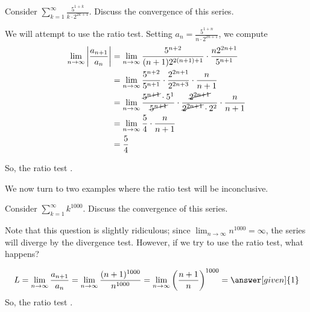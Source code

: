 \documentclass{ximera}
\begin{document}
\begin{example}
  Consider $  \sum_{k=1}^\infty \frac{5^{1+k}}{k \cdot 2^{2k+1}}$.  Discuss the convergence of this series.
  \begin{explanation}
    We will attempt to use the ratio test. Setting $a_n =
    \frac{5^{1+n}}{n \cdot  2^{2n+1}}$, we compute  
\begin{align*}
    \lim_{n \to \infty} \left|\frac{a_{n+1}}{a_n}\right| &= \lim_{n \to \infty} \frac{5^{n+2}}{(n+1)2^{2(n+1)+1}} \cdot  \frac{n 2^{2n+1}}{5^{n+1}}\\
	&=\lim_{n \to \infty} \frac{5^{n+2}}{5^{n+1}} \cdot  \frac{2^{2n+1}}{2^{2n+3}} \cdot \frac{n}{n+1}\\
	&=\lim_{n \to \infty} \frac{\cancel{5^{n+1}}\cdot 5^1}{\cancel{5^{n+1}}} \cdot  \frac{\cancel{2^{2n+1}}}{\cancel{2^{2n+1}}\cdot 2^2} \cdot \frac{n}{n+1}\\
	&=\lim_{n \to \infty} \frac{5}{4} \cdot \frac{n}{n+1}\\
	&=\frac{5}{4}
      \end{align*}	
      
    So, the ratio test
    . 
  \end{explanation}
\end{example}

We now turn to two examples where the ratio test will be inconclusive.

\begin{example}
  Consider $\sum_{k=1}^\infty k^{1000}$.  Discuss the convergence of this series.
  \begin{explanation}
  Note that this question is slightly ridiculous; since $\lim_{n \to \infty} n^{1000} = \infty$, the series will diverge by the divergence test.  However, if we try to use the ratio test, what happens?
  
    \[
  L =  \lim_{n \to \infty} \frac{a_{n+1}}{a_n} =   \lim_{n \to \infty} \frac{(n+1)^{1000}}{n^{1000}}  = \lim_{n \to \infty} \left(\frac{n+1}{n}\right)^{1000} = \answer[given]{1}
    \]
    So, the ratio test
	 .
  \end{explanation}
\end{example}
\end{document}
